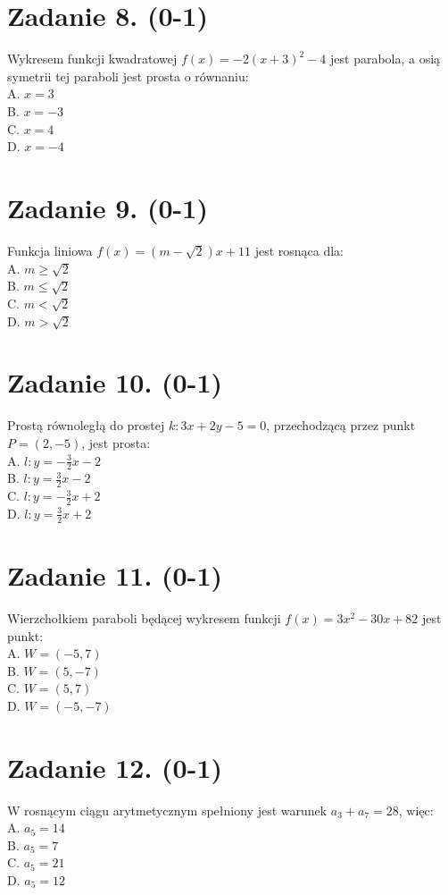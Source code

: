 \documentclass[10pt]{article}
\begin{document}
\section*{Zadanie 8. (0-1)}
Wykresem funkcji kwadratowej \(f(x)=-2(x+3)^{2}-4\) jest parabola, a osią symetrii tej paraboli jest prosta o równaniu:\\
A. \(x=3\)\\
B. \(x=-3\)\\
C. \(x=4\)\\
D. \(x=-4\)

\section*{Zadanie 9. (0-1)}
Funkcja liniowa \(f(x)=(m-\sqrt{2}) x+11\) jest rosnąca dla:\\
A. \(m \geq \sqrt{2}\)\\
B. \(m \leq \sqrt{2}\)\\
C. \(m<\sqrt{2}\)\\
D. \(m>\sqrt{2}\)

\section*{Zadanie 10. (0-1)}
Prostą równoległą do prostej \(k: 3 x+2 y-5=0\), przechodzącą przez punkt \(P=(2,-5)\), jest prosta:\\
A. \(l: y=-\frac{3}{2} x-2\)\\
B. \(l: y=\frac{3}{2} x-2\)\\
C. \(l: y=-\frac{3}{2} x+2\)\\
D. \(l: y=\frac{3}{2} x+2\)

\section*{Zadanie 11. (0-1)}
Wierzchołkiem paraboli będącej wykresem funkcji \(f(x)=3 x^{2}-30 x+82\) jest punkt:\\
A. \(W=(-5,7)\)\\
B. \(W=(5,-7)\)\\
C. \(W=(5,7)\)\\
D. \(W=(-5,-7)\)

\section*{Zadanie 12. (0-1)}
W rosnącym ciągu arytmetycznym spełniony jest warunek \(a_{3}+a_{7}=28\), więc:\\
A. \(a_{5}=14\)\\
B. \(a_{5}=7\)\\
C. \(a_{5}=21\)\\
D. \(a_{5}=12\)
\end{document}
